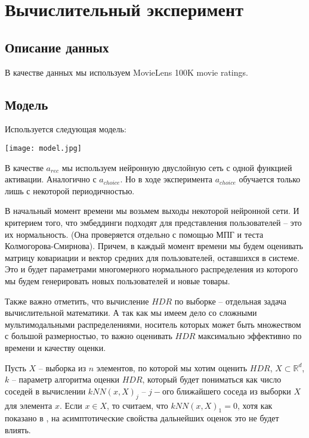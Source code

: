 \documentclass{article}
\begin{document}
\section{Вычислительный эксперимент}

\subsection{Описание данных}

В качестве данных мы используем MovieLens 100K movie ratings.


\subsection{Модель}



Используется следующая модель: 
\begin{center}
\texttt{[image: model.jpg]}
\end{center}

В качестве $a_{rec}$ мы используем нейронную двуслойную сеть с одной функцией активации. Аналогично с $a_{choice}$. Но в ходе эксперимента $a_{choice}$ обучается только лишь с некоторой периодичностью.  

В начальный момент времени мы возьмем выходы некоторой нейронной сети. И критерием того, что эмбеддинги подходят для представления пользователей – это их нормальность. (Она проверяется отдельно с помощью МПГ и теста Колмогорова-Смирнова). Причем, в каждый момент времени мы будем оценивать матрицу ковариации и вектор средних для пользователей, оставшихся в системе. Это и будет параметрами многомерного нормального распределения из которого мы будем генерировать новых пользователей и новые товары.


Также важно отметить, что вычисление $HDR$ по выборке – отдельная задача вычислительной математики. А так как мы имеем дело со сложными мультимодальными распределениями, носитель которых может быть множеством с большой размерностью, то важно оценивать $HDR$ максимально эффективно по времени и качеству оценки. 

Пусть $X$ – выборка из $n$ элементов, по которой мы хотим оценить $HDR$, $X \subset \mathbb{R}^d$, $k$ – параметр алгоритма оценки $HDR$, который будет пониматься как число соседей в вычислении $kNN(x, X)_{j}$ – $j-$ого ближайшего соседа из выборки $X$ для элемента $x$. Если $x\in X$, то считаем, что $kNN(x, X)_{1} = 0$, хотя как показано в \cite{kNN_estimate}, на асимптотические свойства дальнейших оценок это не будет влиять. 
\end{document}
